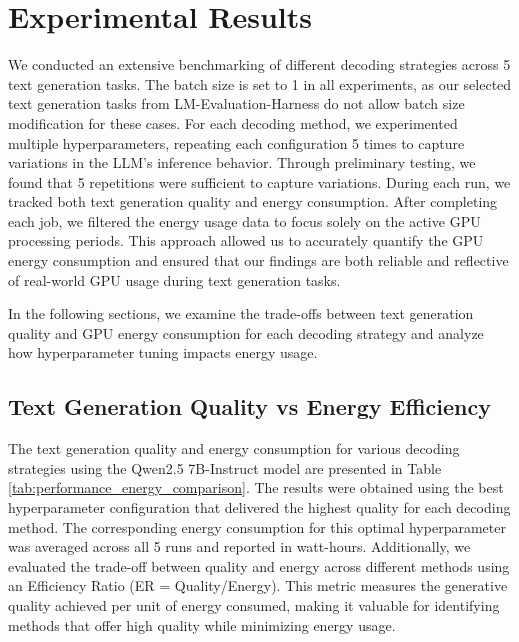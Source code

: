 \section{Experimental Results}
\label{results} 

We conducted an extensive benchmarking of different decoding strategies across 5 text generation tasks. The batch size is set to 1 in all experiments, as our selected text generation tasks from LM-Evaluation-Harness do not allow batch size modification for these cases. For each decoding method, we experimented multiple hyperparameters, repeating each configuration 5 times to capture variations in the LLM's inference behavior. Through preliminary testing, we found that 5 repetitions were sufficient to capture variations. During each run, we tracked both text generation quality and energy consumption. After completing each job, we filtered the energy usage data to focus solely on the active GPU processing periods. This approach allowed us to accurately quantify the GPU energy consumption and ensured that our findings are both reliable and reflective of real-world GPU usage during text generation tasks. 

In the following sections, we examine the trade-offs between text generation quality and GPU energy consumption for each decoding strategy and analyze how hyperparameter tuning impacts energy usage.

\subsection{Text Generation Quality vs Energy Efficiency}
\label{experimental:TG-EF}

The text generation quality and energy consumption for various decoding strategies using the Qwen2.5 7B-Instruct model are presented in Table \ref{tab:performance_energy_comparison}. The results were obtained using the best hyperparameter configuration that delivered the highest quality for each decoding method. The corresponding energy consumption for this optimal hyperparameter was averaged across all 5 runs and reported in watt-hours. Additionally, we evaluated the trade-off between quality and energy across different methods using an Efficiency Ratio (ER = Quality/Energy). This metric measures the generative quality achieved per unit of energy consumed, making it valuable for identifying methods that offer high quality while minimizing energy usage. 

